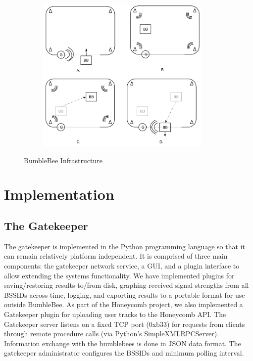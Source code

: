 \begin{figure}[htb] %
	\begin{center}
		\ \includegraphics[width=4in,height=3in]{BumbleBeeExample.png}
		\caption{BumbleBee Infrastructure}
		\label{bumblebeearch}
	\end{center}
\end{figure}


\section{Implementation}
%


\subsection{The Gatekeeper}
%

The gatekeeper is implemented in the Python programming language so that it can remain relatively platform independent. It is comprised of three main components: the gatekeeper network service, a GUI, and a plugin interface to allow extending the systems functionality. We have implemented plugins for saving/restoring results to/from disk, graphing received signal strengths from all BSSIDs across time, logging, and exporting results to a portable format for use outside BumbleBee. As part of the Honeycomb project, we also implemented a Gatekeeper plugin for uploading user tracks to the Honeycomb API. The Gatekeeper server listens on a fixed TCP port (0xb33) for requests from clients through remote procedure calls (via Python's SimpleXMLRPCServer). Information exchange with the bumblebees is done in JSON \cite{json} data format. The gatekeeper administrator configures the BSSIDs and minimum polling interval.


